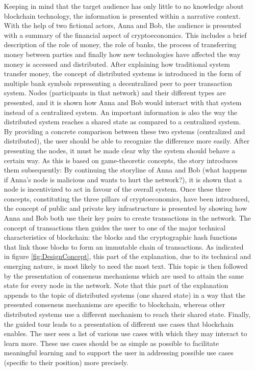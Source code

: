 Keeping in mind that the target audience has only little to no knowledge about blockchain technology, the information is presented within a narrative context. With the help of two fictional actors, Anna and Bob, the audience is presented with a summary of the financial aspect of cryptoeconomics. This includes a brief description of the role of money, the role of banks, the process of transferring money between parties and finally how new technologies have affected the way money is accessed and distributed. After explaining how traditional system transfer money, the concept of distributed systems is introduced in the form of multiple bank symbols representing a decentralized peer to peer transaction system. Nodes (participants in that network) and their different types are presented, and it is shown how Anna and Bob would interact with that system instead of a centralized system. An important information is also the way the distributed system reaches a shared state as compared to a centralized system. By providing a concrete comparison between these two systems (centralized and distributed), the user should be able to recognize the difference more easily. After presenting the nodes, it must be made clear why the system should behave a certain way. As this is based on game-theoretic concepts, the story introduces them subsequently: By continuing the storyline of Anna and Bob (what happens if Anna's node is malicious and wants to hurt the network?), it is shown that a node is incentivized to act in favour of the overall system. Once these three concepts, constituting the three pillars of cryptoeconomics, have been introduced, the concept of public and private key infrastructure is presented by showing how Anna and Bob both use their key pairs to create transactions in the network. The concept of transactions then guides the user to one of the major technical characteristics of blockchain: the blocks and the cryptographic hash functions that link those blocks to form an immutable chain of transactions. As indicated in figure \ref{fig:DesignConcept}, this part of the explanation, due to its technical and emerging nature, is most likely to need the most text. This topic is then followed by the presentation of consensus mechanisms which are used to attain the same state for every node in the network. Note that this part of the explanation appends to the topic of distributed systems (one shared state) in a way that the presented consensus mechanisms are specific to blockchain, whereas other distributed systems use a different mechanism to reach their shared state. Finally, the guided tour leads to a presentation of different use cases that blockchain enables. The user sees a list of various use cases with which they may interact to learn more. These use cases should be as simple as possible to facilitate meaningful learning and to support the user in addressing possible use cases (specific to their position) more precisely.

